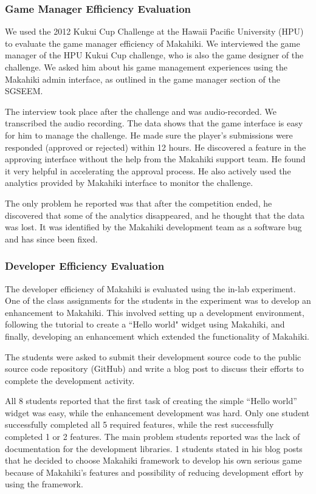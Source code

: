 \documentclass{sigchi}
\begin{document}

\subsubsection{Game Manager Efficiency Evaluation}

We used the 2012 Kukui Cup Challenge at the Hawaii Pacific University (HPU) to evaluate
the game manager efficiency of Makahiki. We interviewed the
game manager of the HPU Kukui Cup challenge, who is also the game designer of the challenge.
We asked him about his game management experiences using the Makahiki admin
interface, as outlined in the game manager section of the SGSEEM.

The interview took place after the challenge and was audio-recorded. We transcribed the audio recording. The data shows that the game interface is easy for him to manage the challenge. He made sure the player's submissions were responded (approved or rejected) within 12 hours. He discovered a feature in the approving interface without the help from the Makahiki support team. He found it very helpful in accelerating the approval process. He also actively used the analytics provided by Makahiki interface to monitor the challenge.

 The only problem he reported was that after the competition ended, he discovered that some of the analytics disappeared, and he thought that the data was lost. It was identified by the Makahiki development team as a software bug and has since been fixed.

\subsubsection{Developer Efficiency Evaluation}

The developer efficiency of Makahiki is evaluated using the in-lab experiment. One of the
class assignments for the students in the experiment was to develop an enhancement to Makahiki.
 This involved setting up a development environment, following the tutorial
to create a ``Hello world" widget using Makahiki, and finally,
developing an enhancement which extended the functionality of Makahiki.

The students were asked to submit their development source code to the
public source code repository (GitHub) and write a blog post to
discuss their efforts to complete the development activity.

All 8 students reported that the first task of creating the simple ``Hello world''
widget was easy, while the enhancement development was hard. Only one student
successfully completed all 5 required features, while the rest successfully completed
1 or 2 features. The main problem students reported was the lack of documentation for
the development libraries. 1 students stated in his blog posts that he decided to choose Makahiki framework to develop his own serious game because of Makahiki's features and possibility of reducing development effort by using the framework.
\end{document}
